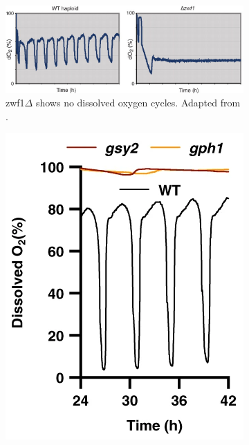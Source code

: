 \begin{figure}
  \centering
  \begin{subfigure}[htpb]{0.9\textwidth}
   \centering
   \includegraphics[width=\textwidth]{tuCyclicChangesMetabolic2007_2c_adapted}
   \caption{
     zwf1$\Delta$ shows no dissolved oxygen cycles.
     Adapted from \textcite{tuCyclicChangesMetabolic2007}.
   }
   \label{fig:intro-ymc-zwf1}
  \end{subfigure}
  \begin{subfigure}[htpb]{0.4\textwidth}
   \centering
   \includegraphics[width=\textwidth]{oneillEukaryoticCellBiology2020_5a_adapted}

\end{subfigure}
\end{figure}

